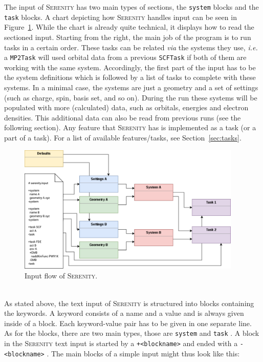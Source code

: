 \documentclass[bibliography=totocnumbered,a4paper,10pt,oneside]{scrbook}
\newcommand{
\serenity}{\textsc{Serenity}\xspace}
\newcommand{\ttt}[1]{%
  \begingroup\setlength{\fboxsep}{1pt}%
  \colorbox{serenity-green!30}{\texttt{\hspace*{2pt}\vphantom{(g}#1\hspace*{2pt}}}%
  \endgroup
}
\begin{document}
The input of \serenity has two main types of sections, the \ttt{system} blocks and the \ttt{task} blocks.
A chart depicting how \serenity handles input can be seen in Figure~\ref{fig:input}.
While the chart is already quite technical, it displays how to read the sectioned input.
Starting from the right, the main job of the program is to run tasks in a certain order.
These tasks can be related \textit{via} the systems they use, \textit{i.e.} a \ttt{MP2Task} will used
orbital data from a previous \ttt{SCFTask} if both of them are working with the same system.
Accordingly, the first part of the input has to be the system definitions which is followed by
a list of tasks to complete with these systems.
In a minimal case, the systems are just a geometry and a set of settings (such as charge, spin, basis set, and so on).
During the run these systems will be populated with more (calculated) data, such as orbitals, energies and electron densities.
This additional data can also be read from previous runs (see the following section).
Any feature that \serenity has is implemented as a task (or a part of a task).
For a list of available features/tasks, see Section~\ref{sec:tasks}.
\begin{figure}[h!]
\label{fig:input}
\includegraphics[width=0.95\textwidth]{./figs/SerenityInput.pdf}
\caption{Input flow of \serenity.}
\end{figure}\\
As stated above, the text input of \serenity is structured into blocks containing the keywords.
A keyword consists of a name and a value and is always given inside of a block.
Each keyword-value pair has to be given in one separate line.
As for the blocks, there are two main types, those are \ttt{system} and \ttt{task}.
A block in the {\serenity} text input is started by a \ttt{+<blockname>} and ended with a
\ttt{-<blockname>}.
The main blocks of a simple input might thus look like this:
\end{document}
